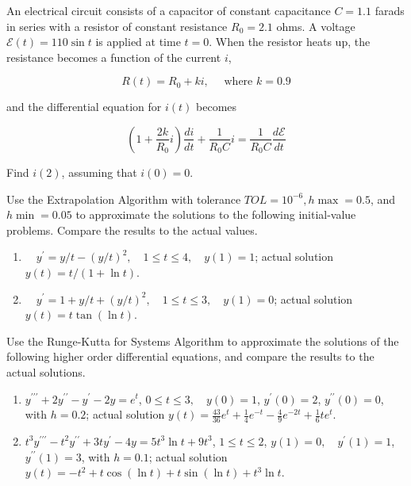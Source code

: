 \begin{posttest}%
\item An electrical circuit consists of a capacitor of constant capacitance $C=1.1$ farads in series with a resistor of constant resistance $R_{0}=2.1$ ohms. A voltage $\mathcal{E}(t)=110 \sin t$ is applied at time $t=0$. When the resistor heats up, the resistance becomes a function of the current $i$,


$$
R(t)=R_{0}+k i, \quad \text { where } k=0.9
$$

and the differential equation for $i(t)$ becomes

$$
\left(1+\frac{2 k}{R_{0}} i\right) \frac{d i}{d t}+\frac{1}{R_{0} C} i=\frac{1}{R_{0} C} \frac{d \mathcal{E}}{d t}
$$

Find $i(2)$, assuming that $i(0)=0$. 


\item Use the Extrapolation Algorithm with tolerance $T O L=10^{-6}, h \max =0.5$, and $h \min =0.05$ to approximate the solutions to the following initial-value problems. Compare the results to the actual values.
\begin{enumerate}[label=(\alph*)]
  \item $\quad y^{\prime}=y / t-(y / t)^{2}, \quad 1 \leq t \leq 4, \quad y(1)=1$; actual solution $y(t)=t /(1+\ln t)$.\\
\item $\quad y^{\prime}=1+y / t+(y / t)^{2}, \quad 1 \leq t \leq 3, \quad y(1)=0$; actual solution $y(t)=t \tan (\ln t)$.
\end{enumerate}

\item Use the Runge-Kutta for Systems Algorithm to approximate the solutions of the following higher order differential equations, and compare the results to the actual solutions.
\begin{enumerate}[label=(\alph*)]
\item $y^{\prime \prime \prime}+2 y^{\prime \prime}-y^{\prime}-2 y=e^{t}$, $0 \leq t \leq 3, \quad y(0)=1$, $y^{\prime}(0)=2$, $y^{\prime \prime}(0)=0$, with $h=0.2$; actual solution $y(t)=\frac{43}{36} e^{t}+\frac{1}{4} e^{-t}-\frac{4}{9} e^{-2 t}+\frac{1}{6} t e^{t}$.\\
\item $t^{3} y^{\prime \prime \prime}-t^{2} y^{\prime \prime}+3 t y^{\prime}-4 y=5 t^{3} \ln t+9 t^{3}$, $1 \leq t \leq 2$, $y(1)=0, \quad y^{\prime}(1)=1$, $y^{\prime \prime}(1)=3$, with $h=0.1$; actual solution $y(t)=-t^{2}+t \cos (\ln t)+t \sin (\ln t)+t^{3} \ln t$.
\end{enumerate}


\end{posttest}
